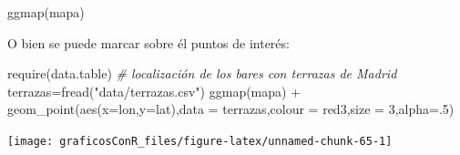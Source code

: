\documentclass[
]{article}
\newenvironment{Shaded}{\begin{snugshade}}{\end{snugshade}}
\newcommand{\AttributeTok}[1]{\textcolor[rgb]{0.77,0.63,0.00}{#1}}
\newcommand{\CommentTok}[1]{\textcolor[rgb]{0.56,0.35,0.01}{\textit{#1}}}
\newcommand{\DecValTok}[1]{\textcolor[rgb]{0.00,0.00,0.81}{#1}}
\newcommand{\FunctionTok}[1]{\textcolor[rgb]{0.00,0.00,0.00}{#1}}
\newcommand{\NormalTok}[1]{#1}
\newcommand{\OtherTok}[1]{\textcolor[rgb]{0.56,0.35,0.01}{#1}}
\newcommand{\SpecialCharTok}[1]{\textcolor[rgb]{0.00,0.00,0.00}{#1}}
\newcommand{\StringTok}[1]{\textcolor[rgb]{0.31,0.60,0.02}{#1}}
\numberwithin{ejcnt}{section}
\begin{document}
\begin{Shaded}
\begin{Highlighting}[]
\FunctionTok{ggmap}\NormalTok{(mapa)}
\end{Highlighting}
\end{Shaded}

O bien se puede marcar sobre él puntos de interés:

\begin{Shaded}
\begin{Highlighting}[]
\FunctionTok{require}\NormalTok{(data.table)}
\CommentTok{\# localización de los bares con terrazas de Madrid}
\NormalTok{terrazas}\OtherTok{=}\FunctionTok{fread}\NormalTok{(}\StringTok{"data/terrazas.csv"}\NormalTok{) }
\FunctionTok{ggmap}\NormalTok{(mapa) }\SpecialCharTok{+}  
  \FunctionTok{geom\_point}\NormalTok{(}\FunctionTok{aes}\NormalTok{(}\AttributeTok{x=}\NormalTok{lon,}\AttributeTok{y=}\NormalTok{lat),}\AttributeTok{data =}\NormalTok{ terrazas,}\AttributeTok{colour =} \StringTok{\textquotesingle{}red3\textquotesingle{}}\NormalTok{,}\AttributeTok{size =} \DecValTok{3}\NormalTok{,}\AttributeTok{alpha=}\NormalTok{.}\DecValTok{5}\NormalTok{)}
\end{Highlighting}
\end{Shaded}

\begin{center}\texttt{[image: graficosConR\_files/figure-latex/unnamed-chunk-65-1]} \end{center}
\end{document}
